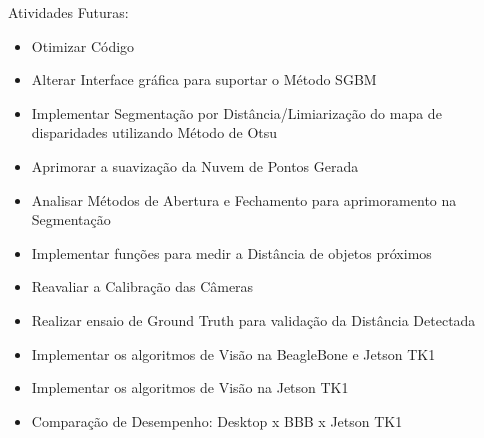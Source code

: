 Atividades Futuras:

\begin{itemize}
	\item Otimizar Código
	\item Alterar Interface gráfica para suportar o Método SGBM
	\item Implementar Segmentação por Distância/Limiarização do mapa de disparidades utilizando Método de Otsu
	\item Aprimorar a suavização da Nuvem de Pontos Gerada
	\item Analisar Métodos de Abertura e Fechamento para aprimoramento na Segmentação
	\item Implementar funções para medir a Distância de objetos próximos
	\item Reavaliar a Calibração das Câmeras	
	\item Realizar ensaio de Ground Truth para validação da Distância Detectada
	\item Implementar os algoritmos de Visão na BeagleBone e Jetson TK1
	\item Implementar os algoritmos de Visão na Jetson TK1
	\item Comparação de Desempenho: Desktop x BBB x Jetson TK1
\end{itemize}



